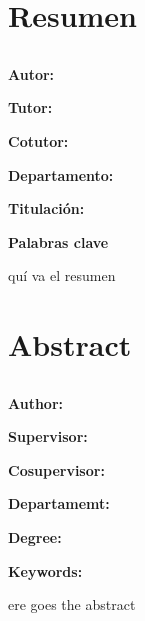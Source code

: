 \chapter*{Resumen}

\section*{\Large \textsf{\tfeTitle}}

\begin{flushleft}
    \textbf{Autor:} \tfeAuthor
    
    \textbf{Tutor:} \tfeTutor
    
    \textbf{Cotutor:} \tfeCotutor
    
    \textbf{Departamento:} \tfeDepartment
    
    \textbf{Titulación:} \tfeDegree
    
    \textbf{Palabras clave} \tfeKeywords
    
\end{flushleft}

\vspace{1cm}
\begin{SingleSpace}

quí va el resumen

\end{SingleSpace}


\cleardoublepage

\chapter*{Abstract}

\section*{\Large \textsf{\tfeEnglishTitle}}

\begin{flushleft}
    \textbf{Author:} \tfeAuthor
    
    \textbf{Supervisor:} \tfeTutor
    
    \textbf{Cosupervisor:} \tfeCotutor
    
    \textbf{Departamemt:} \tfeDepartment
    
    \textbf{Degree:} \tfeDegree
    
    \textbf{Keywords:} \tfeKeywords 
\end{flushleft}

\vspace{1cm}
\begin{SingleSpace}

ere goes the abstract

\end{SingleSpace}

